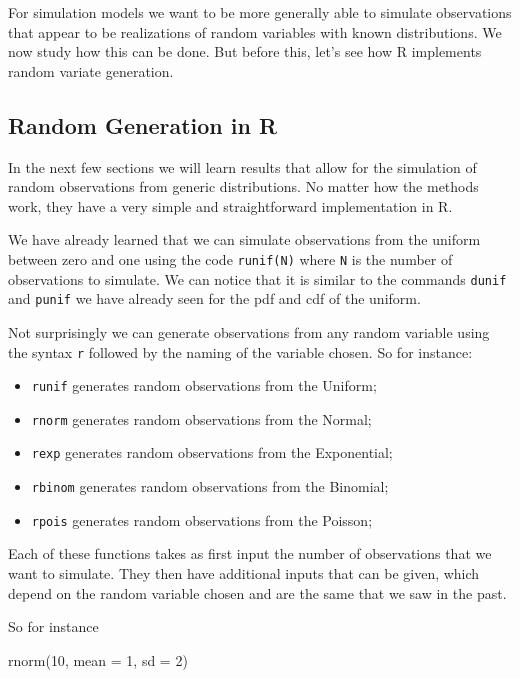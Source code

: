 \documentclass[
]{book}
\newenvironment{Shaded}{\begin{snugshade}}{\end{snugshade}}
\newcommand{\AttributeTok}[1]{\textcolor[rgb]{0.77,0.63,0.00}{#1}}
\newcommand{\DecValTok}[1]{\textcolor[rgb]{0.00,0.00,0.81}{#1}}
\newcommand{\FunctionTok}[1]{\textcolor[rgb]{0.00,0.00,0.00}{#1}}
\newcommand{\NormalTok}[1]{#1}
\theoremstyle{definition}
\theoremstyle{definition}
\theoremstyle{definition}
\theoremstyle{definition}
\theoremstyle{remark}
\begin{document}
For simulation models we want to be more generally able to simulate observations that appear to be realizations of random variables with known distributions. We now study how this can be done. But before this, let's see how R implements random variate generation.

\hypertarget{random-generation-in-r}{%
\subsection{Random Generation in R}\label{random-generation-in-r}}

In the next few sections we will learn results that allow for the simulation of random observations from generic distributions. No matter how the methods work, they have a very simple and straightforward implementation in R.

We have already learned that we can simulate observations from the uniform between zero and one using the code \texttt{runif(N)} where \texttt{N} is the number of observations to simulate. We can notice that it is similar to the commands \texttt{dunif} and \texttt{punif} we have already seen for the pdf and cdf of the uniform.

Not surprisingly we can generate observations from any random variable using the syntax \texttt{r} followed by the naming of the variable chosen. So for instance:

\begin{itemize}
\item
  \texttt{runif} generates random observations from the Uniform;
\item
  \texttt{rnorm} generates random observations from the Normal;
\item
  \texttt{rexp} generates random observations from the Exponential;
\item
  \texttt{rbinom} generates random observations from the Binomial;
\item
  \texttt{rpois} generates random observations from the Poisson;
\end{itemize}

Each of these functions takes as first input the number of observations that we want to simulate. They then have additional inputs that can be given, which depend on the random variable chosen and are the same that we saw in the past.

So for instance

\begin{Shaded}
\begin{Highlighting}[]
\FunctionTok{rnorm}\NormalTok{(}\DecValTok{10}\NormalTok{, }\AttributeTok{mean =} \DecValTok{1}\NormalTok{, }\AttributeTok{sd =} \DecValTok{2}\NormalTok{)}
\end{Highlighting}
\end{Shaded}
\end{document}
